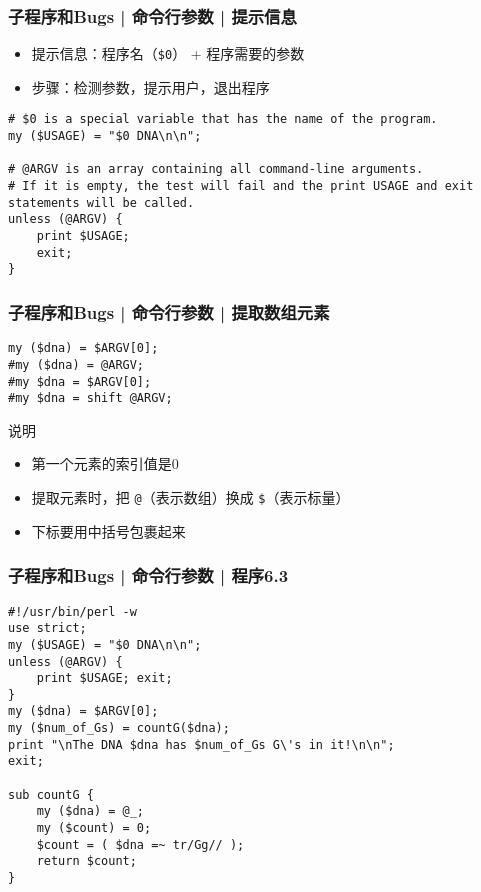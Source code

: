 \begin{frame}[fragile]
  \frametitle{子程序和Bugs | 命令行参数 | \alert{提示信息}}
  \begin{itemize}
    \item 提示信息：程序名（\verb|$0|） + 程序需要的参数
    \item 步骤：检测参数，提示用户，退出程序
  \end{itemize}
\begin{lstlisting}
# $0 is a special variable that has the name of the program.
my ($USAGE) = "$0 DNA\n\n";

# @ARGV is an array containing all command-line arguments.
# If it is empty, the test will fail and the print USAGE and exit statements will be called.
unless (@ARGV) {
    print $USAGE;
    exit;
}
\end{lstlisting}
\end{frame}

\begin{frame}[fragile]
  \frametitle{子程序和Bugs | 命令行参数 | \alert{提取数组元素}}
\begin{lstlisting}
my ($dna) = $ARGV[0];
#my ($dna) = @ARGV;
#my $dna = $ARGV[0];
#my $dna = shift @ARGV;
\end{lstlisting}
\begin{block}{说明}
  \begin{itemize}
    \item 第一个元素的索引值是0
    \item 提取元素时，把 \verb|@|（表示数组）换成 \verb|$|（表示标量）
    \item 下标要用中括号包裹起来
  \end{itemize}
\end{block}
\end{frame}

\begin{frame}[fragile]
  \frametitle{子程序和Bugs | 命令行参数 | \alert{程序6.3}}
  \vspace{-0.5em}
\begin{lstlisting}[basicstyle=\small\tt]
#!/usr/bin/perl -w
use strict;
my ($USAGE) = "$0 DNA\n\n";
unless (@ARGV) {
    print $USAGE; exit;
}
my ($dna) = $ARGV[0];
my ($num_of_Gs) = countG($dna);
print "\nThe DNA $dna has $num_of_Gs G\'s in it!\n\n";
exit;

sub countG {
    my ($dna) = @_;
    my ($count) = 0;
    $count = ( $dna =~ tr/Gg// );
    return $count;
}
\end{lstlisting}
\end{frame}

